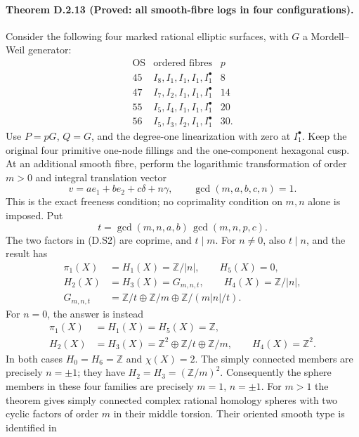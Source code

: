 \paragraph{Theorem D.2.13 (Proved: all smooth-fibre logs in four configurations).}
Consider the following four marked rational elliptic surfaces,
with $G$ a Mordell--Weil generator:
\[
\begin{array}{c|l|r}
\mathrm{OS}&\text{ordered fibres}&p\\\hline
45&I_8,I_1,I_1,I_1,I_1^\bullet&8\\
47&I_7,I_2,I_1,I_1,I_1^\bullet&14\\
55&I_5,I_4,I_1,I_1,I_1^\bullet&20\\
56&I_5,I_3,I_2,I_1,I_1^\bullet&30.
\end{array}
\]
Use $P=pG$, $Q=G$, and the degree-one linearization with zero
at $I_1^\bullet$. Keep the original four primitive one-node
fillings and the one-component hexagonal cusp. At an additional
smooth fibre, perform the logarithmic transformation of order
$m>0$ and integral translation vector
\[
 v=a e_1+b e_2+c\delta+n\gamma,\qquad
 \gcd(m,a,b,c,n)=1.
 \tag{D.S1}
\]
This is the exact freeness condition; no coprimality condition
on $m,n$ alone is imposed. Put
\[
 t=\gcd(m,n,a,b)\,\gcd(m,n,p,c).
 \tag{D.S2}
\]
The two factors in (D.S2) are coprime, and $t\mid m$.
For $n\ne0$, also $t\mid n$, and the result has
\[
\begin{aligned}
 \pi_1(X)&=H_1(X)=\mathbb Z/|n|,\qquad H_5(X)=0,\\
 H_2(X)&=H_3(X)=G_{m,n,t},\qquad H_4(X)=\mathbb Z/|n|,\\
 G_{m,n,t}&=\mathbb Z/t\oplus\mathbb Z/m
               \oplus\mathbb Z/(m|n|/t).
\end{aligned}
\tag{D.S3}
\]
For $n=0$, the answer is instead
\[
\begin{aligned}
 \pi_1(X)&=H_1(X)=H_5(X)=\mathbb Z,\\
 H_2(X)&=H_3(X)=\mathbb Z^2\oplus\mathbb Z/t\oplus\mathbb Z/m,
 \qquad H_4(X)=\mathbb Z^2.
\end{aligned}
\tag{D.S4}
\]
In both cases $H_0=H_6=\mathbb Z$ and $\chi(X)=2$.
The simply connected members are precisely $n=\pm1$; they
have $H_2=H_3=(\mathbb Z/m)^2$. Consequently the sphere
members in these four families are precisely $m=1$, $n=\pm1$.
For $m>1$ the theorem gives simply connected complex rational
homology spheres with two cyclic factors of order $m$ in their
middle torsion. Their oriented smooth type is identified in
